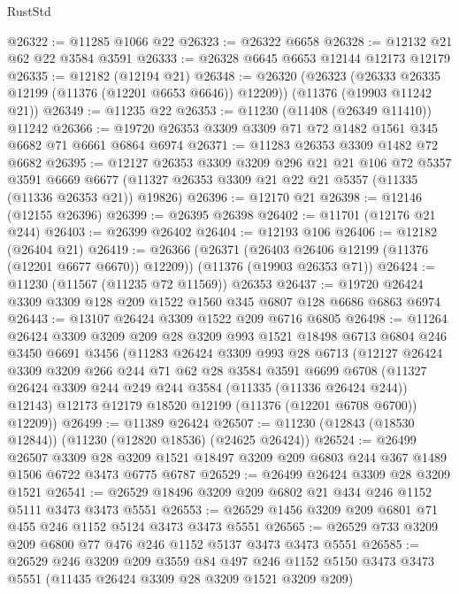 \begin{lexlean}{RustStd}
\begin{coremodule}
{{{{{{{{{{{{{{{{{{{@26322 := @11285 @1066 @22
@26323 := @26322 @6658
@26328 := @12132 @21 @62 @22 @3584 @3591
@26333 := @26328 @6645 @6653 @12144 @12173 @12179
@26335 := @12182 (@12194 @21)
@26348 := @26320
    (@26323 (@26333 @26335 @12199 (@11376 (@12201 @6653 @6646)) @12209))
    (@11376 (@19903 @11242 @21))
@26349 := @11235 @22
@26353 := @11230 (@11408 (@26349 @11410)) @11242
@26366 := @19720 @26353 @3309 @3309 @71 @72 @1482 @1561 @345 @6682 @71 @6661 @6864 @6974
@26371 := @11283 @26353 @3309 @1482 @72 @6682
@26395 := @12127
    @26353
    @3309
    @3209
    @296
    @21
    @21
    @106
    @72
    @5357
    @3591
    @6669
    @6677
    (@11327 @26353 @3309 @21 @22 @21 @5357 (@11335 (@11336 @26353 @21)) @19826)
@26396 := @12170 @21
@26398 := @12146 (@12155 @26396)
@26399 := @26395 @26398
@26402 := @11701 (@12176 @21 @244)
@26403 := @26399 @26402
@26404 := @12193 @106
@26406 := @12182 (@26404 @21)
@26419 := @26366
    (@26371 (@26403 @26406 @12199 (@11376 (@12201 @6677 @6670)) @12209))
    (@11376 (@19903 @26353 @71))
@26424 := @11230 (@11567 (@11235 @72 @11569)) @26353
@26437 := @19720 @26424 @3309 @3309 @128 @209 @1522 @1560 @345 @6807 @128 @6686 @6863 @6974
@26443 := @13107 @26424 @3309 @1522 @209 @6716 @6805
@26498 := @11264
    @26424
    @3309
    @3209
    @209
    @28
    @3209
    @993
    @1521
    @18498
    @6713
    @6804
    @246
    @3450
    @6691
    @3456
    (@11283
      @26424
      @3309
      @993
      @28
      @6713
      (@12127
        @26424
        @3309
        @3209
        @266
        @244
        @71
        @62
        @28
        @3584
        @3591
        @6699
        @6708
        (@11327 @26424 @3309 @244 @249 @244 @3584 (@11335 (@11336 @26424 @244)) @12143)
        @12173
        @12179
        @18520
        @12199
        (@11376 (@12201 @6708 @6700))
        @12209))
@26499 := @11389 @26424
@26507 := @11230 (@12843 (@18530 @12844)) (@11230 (@12820 @18536) (@24625 @26424))
@26524 := @26499
    @26507
    @3309
    @28
    @3209
    @1521
    @18497
    @3209
    @209
    @6803
    @244
    @367
    @1489
    @1506
    @6722
    @3473
    @6775
    @6787
@26529 := @26499 @26424 @3309 @28 @3209 @1521
@26541 := @26529 @18496 @3209 @209 @6802 @21 @434 @246 @1152 @5111 @3473 @3473 @5551
@26553 := @26529 @1456 @3209 @209 @6801 @71 @455 @246 @1152 @5124 @3473 @3473 @5551
@26565 := @26529 @733 @3209 @209 @6800 @77 @476 @246 @1152 @5137 @3473 @3473 @5551
@26585 := @26529
    @246
    @3209
    @209
    @3559
    @84
    @497
    @246
    @1152
    @5150
    @3473
    @3473
    @5551
    (@11435 @26424 @3309 @28 @3209 @1521 @3209 @209)
}}}}}}}}}}}}}}}}}}}
\end{coremodule}
\end{lexlean}
